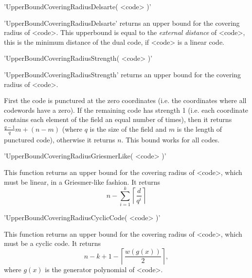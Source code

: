 'UpperBoundCoveringRadiusDelsarte( <code> )'

'UpperBoundCoveringRadiusDelsarte' returns an upper bound for the
covering radius of <code>.
This upperbound is equal to the {\em external distance} of <code>,
this is the minimum distance of the dual code, if
<code> is a linear code.




'UpperBoundCoveringRadiusStrength( <code> )'

'UpperBoundCoveringRadiusStrength' returns an upper bound for the
covering radius of <code>.

First the code is punctured at the zero coordinates (i.e. the
coordinates where all codewords have a zero).
If the remaining code has strength 1 (i.e. each coordinate contains
each element
of the field an equal number of times), then it returns
$\frac{q-1}{q}m + (n-m)$ (where $q$ is the size of the field and $m$
is the length of punctured code), otherwise it
returns $n$.
This bound works for all codes.




'UpperBoundCoveringRadiusGriesmerLike( <code> )'

This function returns an upper bound for the covering
radius of <code>, which must be linear, in a Griesmer-like fashion.
It returns
\begin{equation}
    n - \sum_{i=1}^k \left\lceil \frac{d}{q^i} \right\rceil
\end{equation}




'UpperBoundCoveringRadiusCyclicCode( <code> )'

This function returns an upper bound for the covering radius of <code>,
which must be a cyclic code.
It returns
\begin{equation}
    n - k + 1 - \left\lceil \frac{w(g(x))}{2} \right\rceil,
\end{equation}
where $g(x)$ is the generator polynomial of <code>.


